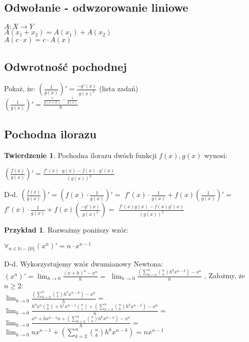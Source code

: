 \documentclass{article}
\theoremstyle{definition}
\theoremstyle{definition}
\newtheorem{tw}{Twierdzenie}[subsection]
\theoremstyle{definition}
\newtheorem{pk}{Przykład}[subsection]
\theoremstyle{definition}
\begin{document}
\subsection{Odwołanie - odwzorowanie liniowe}

$A: X\rightarrow Y$\\
$A(x_1+x_2)=A(x_1)+A(x_2)$\\
$A(c\cdot x)=c\cdot A(x)$

\subsection{Odwrotność pochodnej}

Pokaż, że: $\left(\frac{1}{g(x)}\right)'=\frac{-g'(x)}{g(x)^2}$ (lista zadań)\\
$\left(\frac{1}{g(x)}\right)' = \frac{\frac{1}{g(x+h)}-\frac{1}{g(x)}}{h}$

\subsection{Pochodna ilorazu}

\begin{tw}
    Pochodna ilorazu dwóch funkcji $f(x), g(x)$ wynosi:
    \begin{center}
        $\left(\frac{f(x)}{g(x)}\right)'=\frac{f'(x)\cdot g(x)-f(x)\cdot g'(x)}{\left(g(x)\right)^2}$
    \end{center}
    D-d. $\left(\frac{f(x)}{g(x)}\right)'=\left(f(x)\cdot \frac{1}{g(x)}\right)'=$
    $f'(x)\cdot\frac{1}{g(x)} + f(x)\left(\frac{1}{g(x)}\right)'=$
    $f'(x)\cdot\frac{1}{g(x)} + f(x)\left(\frac{-g'(x)}{g(x)^2}\right)=$
    $\frac{f'(x)g(x)-f(x)g'(x)}{\left(g(x)\right)^2}$
\end{tw}

\begin{pk}
    Rozważmy poniższy wzór:
    \begin{center}
        $\forall_{n\in\mathbb{N}-\{0\}} (x^n)' = n\cdot x^{n-1}$
    \end{center}
    D-d. Wykorzystujemy wzór dwumianowy Newtona:\\
    $(x^n)'=\lim_{h\rightarrow 0} \frac{(x+h)^n-x^n}{h}=$
    $\lim_{h\rightarrow 0} \frac{\left(\sum_{k=0}^{n} \binom{n}{k} h^k x^{n-k}\right) - x^{n}}{h}$
    , Założmy, że $n\geq 2$:\\
    $\lim_{h\rightarrow 0} \frac{\left(\sum_{k=0}^{n} \binom{n}{k} h^k x^{n-k}\right) - x^{n}}{h}=$
    $\lim_{h\rightarrow 0} \frac{h^0 x^n \binom{n}{0}+h^1 x^{n-1} \binom{n}{1} + \left(\sum_{k=2}^{n} \binom{n}{k} h^k x^{n-k}\right) - x^n}{h}=$\\
    $\lim_{h\rightarrow 0} \frac{x^n + h x^{n-1} n + \left(\sum_{k=2}^{n} \binom{n}{k} h^k x^{n-k}\right) - x^n}{h}=$
    $\lim_{h\rightarrow 0} n x^{n-1} + \left(\sum_{k=2}^{n} \binom{n}{k} h^k x^{n-k}\right) = n x^{n-1}$
\end{pk}
\end{document}

